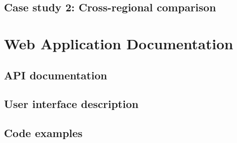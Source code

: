 \documentclass[preprint,12pt]{elsarticle}
\begin{document}
\subsection{Case study 2: Cross-regional comparison}
\label{subsec:cross_regional}

\section{Web Application Documentation}
\label{sec:web_app_doc}

\subsection{API documentation}
\label{subsec:api_doc}

\subsection{User interface description}
\label{subsec:ui_description}

\subsection{Code examples}
\label{subsec:code_examples}




\end{document}
